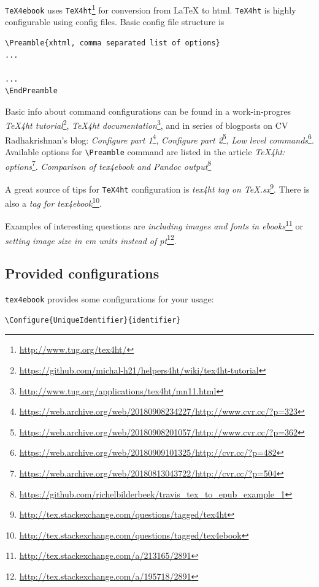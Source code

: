 \texttt{TeX4ebook} uses \texttt{TeX4ht}\footnote{\url{http://www.tug.org/tex4ht/}}
for conversion from LaTeX to html. \texttt{TeX4ht} is highly
configurable using config files. Basic config file structure is

\begin{verbatim}
\Preamble{xhtml, comma separated list of options}
...

...
\EndPreamble
\end{verbatim}

Basic info about command configurations can be found in a
work-in-progres \emph{TeX4ht tutorial}\footnote{\url{https://github.com/michal-h21/helpers4ht/wiki/tex4ht-tutorial}},
\emph{TeX4ht documentation}\footnote{\url{http://www.tug.org/applications/tex4ht/mn11.html}},
and in series of blogposts on CV Radhakrishnan's blog: \emph{Configure
part 1}\footnote{\url{https://web.archive.org/web/20180908234227/http://www.cvr.cc/?p=323}},
\emph{Configure part 2}\footnote{\url{https://web.archive.org/web/20180908201057/http://www.cvr.cc/?p=362}},
\emph{Low level commands}\footnote{\url{https://web.archive.org/web/20180909101325/http://cvr.cc/?p=482}}.
Available options for \texttt{\textbackslash{}Preamble} command are
listed in the article \emph{TeX4ht: options}\footnote{\url{https://web.archive.org/web/20180813043722/http://cvr.cc/?p=504}}.
\emph{Comparison of tex4ebook and Pandoc output}\footnote{\url{https://github.com/richelbilderbeek/travis_tex_to_epub_example_1}}

A great source of tips for \texttt{TeX4ht} configuration is \emph{tex4ht
tag on TeX.sx}\footnote{\url{http://tex.stackexchange.com/questions/tagged/tex4ht}}.
There is also a \emph{tag for tex4ebook}\footnote{\url{http://tex.stackexchange.com/questions/tagged/tex4ebook}}.

Examples of interesting questions are \emph{including images and fonts
in ebooks}\footnote{\url{http://tex.stackexchange.com/a/213165/2891}} or
\emph{setting image size in em units instead of pt}\footnote{\url{http://tex.stackexchange.com/a/195718/2891}}.

\subsection{Provided configurations}\label{provided-configurations}

\texttt{tex4ebook} provides some configurations for your usage:

\begin{verbatim}
\Configure{UniqueIdentifier}{identifier}
\end{verbatim}

